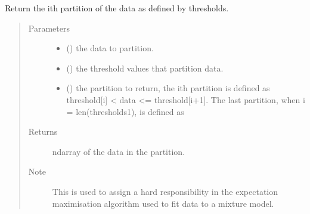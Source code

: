\documentclass[letterpaper,10pt,english]{sphinxmanual}
\begin{document}

\begin{fulllineitems}
\label{\detokenize{tes:tes.analysis.partition}}
\sphinxAtStartPar
Return the ith partition of the data as defined by thresholds.
\begin{quote}\begin{description}
\item[{Parameters}] \leavevmode\begin{itemize}
\item {} 
\sphinxAtStartPar
{} () \textendash{} the data to partition.

\item {} 
\sphinxAtStartPar
{} () \textendash{} the threshold values that partition data.

\item {} 
\sphinxAtStartPar
{} () \textendash{} the partition to return, the ith partition is defined as
threshold{[}i{]} \textless{} data \textless{}= threshold{[}i+1{]}. The last partition,
when i = len(thresholds\sphinxhyphen{}1), is defined as

\end{itemize}

\item[{Returns}] \leavevmode
\sphinxAtStartPar
ndarray of the data in the partition.

\item[{Note}] \leavevmode
\sphinxAtStartPar
This is used to assign a hard responsibility in the expectation
maximisation algorithm used to fit data to a mixture model.

\end{description}\end{quote}

\end{fulllineitems}

\end{document}
